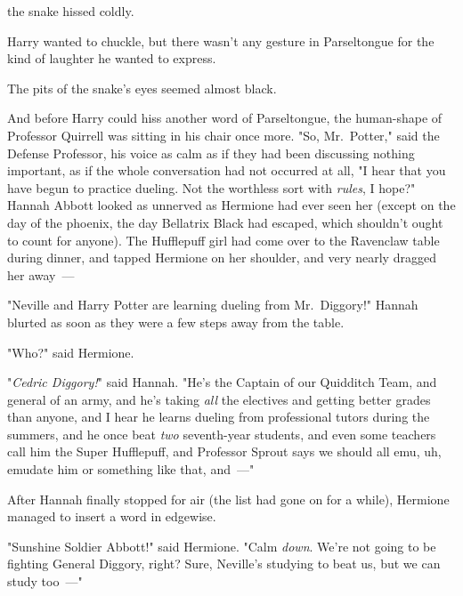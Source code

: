  the snake hissed coldly. 

Harry wanted to chuckle, but there wasn't any gesture in Parseltongue for the
kind of laughter he wanted to express.

The pits of the snake's eyes seemed almost black. 

And before Harry could hiss another word of Parseltongue, the human-shape of
Professor Quirrell was sitting in his chair once more. "So, Mr.~Potter," said
the Defense Professor, his voice as calm as if they had been discussing nothing
important, as if the whole conversation had not occurred at all, "I hear that
you have begun to practice dueling. Not the worthless sort with \emph{rules}, I
hope?"
\sbreak
Hannah Abbott looked as unnerved as Hermione had ever seen her (except on the
day of the phoenix, the day Bellatrix Black had escaped, which shouldn't ought
to count for anyone). The Hufflepuff girl had come over to the Ravenclaw table
during dinner, and tapped Hermione on her shoulder, and very nearly dragged her
away~---

"Neville and Harry Potter are learning dueling from Mr.~Diggory!" Hannah
blurted as soon as they were a few steps away from the table.

"Who?" said Hermione.

"\emph{Cedric Diggory!}" said Hannah. "He's the Captain of our Quidditch Team,
and general of an army, and he's taking \emph{all} the electives and getting
better grades than anyone, and I hear he learns dueling from professional
tutors during the summers, and he once beat \emph{two} seventh-year students,
and even some teachers call him the Super Hufflepuff, and Professor Sprout says
we should all emu, uh, emudate him or something like that, and~---"

After Hannah finally stopped for air (the list had gone on for a while),
Hermione managed to insert a word in edgewise.

"Sunshine Soldier Abbott!" said Hermione. "Calm \emph{down}. We're not going to
be fighting General Diggory, right? Sure, Neville's studying to beat us, but we
can study too~---"

